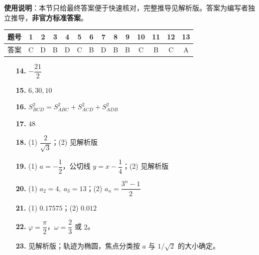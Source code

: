 
\begin{gknotice}
\textbf{使用说明}：本节只给最终答案便于快速核对，完整推导见解析版。答案为编写者独立推导，\textbf{非官方标准答案}。
\end{gknotice}

\begin{center}\begin{tabular}{cccccccccccccc}
\toprule
题号 & 1 & 2 & 3 & 4 & 5 & 6 & 7 & 8 & 9 & 10 & 11 & 12 & 13 \\
\midrule
答案 & C & D & B & D & C & B & D & B & B & C & B & C & A \\
\bottomrule
\end{tabular}\end{center}

\begin{itemize}[leftmargin=2.6em]
  \item[\textbf{14.}] $-\dfrac{21}{2}$
  \item[\textbf{15.}] $6,30,10$
  \item[\textbf{16.}] $S_{BCD}^2=S_{ABC}^2+S_{ACD}^2+S_{ADB}^2$
  \item[\textbf{17.}] $48$
\end{itemize}

\begin{itemize}[leftmargin=2.6em]
  \item[\textbf{18.}] (1) $\dfrac{2}{\sqrt3}$；(2) 见解析版
  \item[\textbf{19.}] (1) $a=-\dfrac12$，公切线 $y=x-\dfrac14$；(2) 见解析版
  \item[\textbf{20.}] (1) $a_2=4,\ a_3=13$；(2) $a_n=\dfrac{3^n-1}{2}$
  \item[\textbf{21.}] (1) $0.17575$；(2) $0.012$
  \item[\textbf{22.}] $\varphi=\dfrac\pi2$，$\omega=\dfrac23$ 或 $2$。
  \item[\textbf{23.}] 见解析版；轨迹为椭圆，焦点分类按 $a$ 与 $1/\sqrt2$ 的大小确定。
\end{itemize}
